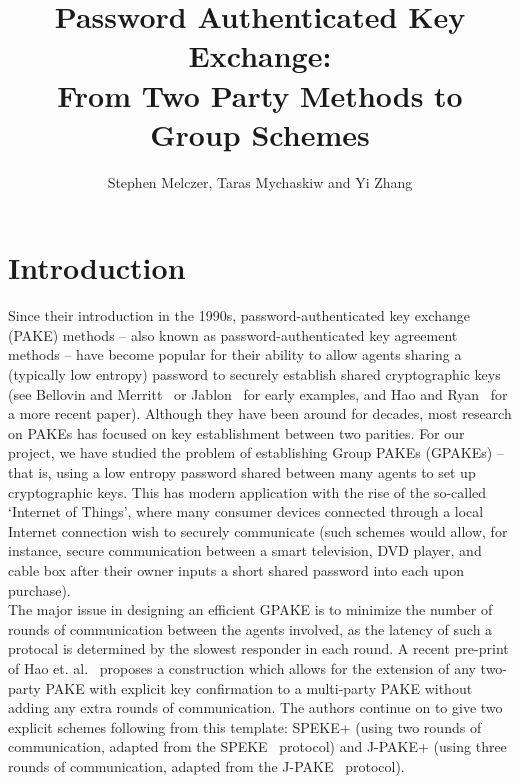 \documentclass{amsart}
\author{Stephen Melczer, Taras Mychaskiw and Yi Zhang}
\title{Password Authenticated Key Exchange:\\ From Two Party Methods to Group Schemes}
\theoremstyle{remark}
\begin{document}
\maketitle

\section{Introduction}

Since their introduction in the 1990s, password-authenticated key exchange (PAKE) methods -- also known as password-authenticated key agreement methods -- have become popular for their ability to allow agents sharing a (typically low entropy) password to securely establish shared cryptographic keys (see Bellovin and Merritt~\cite{BeMe92} or Jablon~\cite{Ja96} for early examples, and Hao and Ryan~\cite{HaRy2010} for a more recent paper).  Although they have been around for decades, most research on PAKEs has focused on key establishment between two parities.  For our project, we have studied the problem of establishing Group PAKEs (GPAKEs) -- that is, using a low entropy password shared between many agents to set up cryptographic keys.  This has modern application with the rise of the so-called `Internet of Things', where many consumer devices connected through a local Internet connection wish to securely communicate (such schemes would allow, for instance, secure communication between a smart television, DVD player, and cable box after their owner inputs a short shared password into each upon purchase).
\\

The major issue in designing an efficient GPAKE is to minimize the number of rounds of communication between the agents involved, as the latency of such a protocal is determined by the slowest responder in each round.  A recent pre-print of Hao et. al.~\cite{HaYiChSh15} proposes a construction which allows for the extension of any two-party PAKE with explicit key confirmation to a multi-party PAKE without adding any extra rounds of communication.  The authors continue on to give two explicit schemes following from this template: SPEKE+ (using two rounds of communication, adapted from the SPEKE~\cite{Ja96} protocol) and J-PAKE+ (using three rounds of communication, adapted from the J-PAKE~\cite{HaRy2010} protocol).
\\ 
\end{document}
